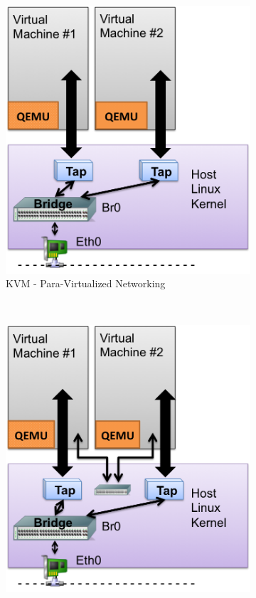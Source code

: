 \begin{enumerate}
\begin{figure}
\begin{subfigure}[b]{0.35\textwidth}
                \includegraphics[width=\textwidth]{kvm-para.png}
                \caption{KVM - Para-Virtualized Networking}
                \label{fig:kvm-para}
        \end{subfigure}
        ~ %
\newline \newline
        \begin{subfigure}[b]{0.35\textwidth}
                \includegraphics[width=\textwidth]{kvm-internal.png}

\end{subfigure}
\end{figure}
\end{enumerate}
